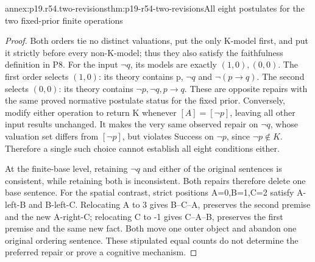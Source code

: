 \begin{annexitem}{annex:p19.r54.two-revisions}{thm:p19-r54-two-revisions}{All eight postulates for the two fixed-prior finite operations}
\begin{proof}
Both orders tie no distinct valuations, put the only K-model
first, and put it strictly before every non-K-model; thus they
also satisfy the faithfulness definition in P8. For the input
\(\neg q\), its models are exactly \((1,0),(0,0)\).
The first order selects \((1,0)\): its theory contains p,
\(\neg q\) and \(\neg(p\to q)\). The second selects
\((0,0)\): its theory contains \(\neg p,\neg q,p\to q\).
These are opposite repairs with the same proved normative
postulate status for the fixed prior.
Conversely, modify either operation to return K whenever
\([A]=[\neg p]\), leaving all other input results unchanged.
It makes the very same observed repair on \(\neg q\), whose
valuation set differs from \([\neg p]\), but violates Success
on \(\neg p\), since \(\neg p\notin K\). Therefore a
single such choice cannot establish all eight conditions either.

At the finite-base level, retaining \(\neg q\) and either
of the original sentences is consistent, while retaining both
is inconsistent. Both repairs therefore delete one base sentence.
For the spatial contrast, strict positions A=0,B=1,C=2
satisfy A-left-B and B-left-C. Relocating A to 3 gives
B--C--A, preserves the second premise and the new A-right-C;
relocating C to -1 gives C--A--B, preserves the first premise
and the same new fact. Both move one outer object and abandon
one original ordering sentence. These stipulated equal counts
do not determine the preferred repair or prove a cognitive mechanism.
\end{proof}
\end{annexitem}
